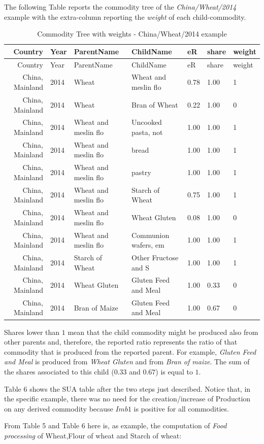 \documentclass[]{article}
\begin{document}
The following Table reports the commodity tree of the
\emph{China/Wheat/2014} example with the extra-column reporting the
\emph{weight} of each child-commodity.

\begin{longtable}[]{@{}rllllll@{}}
\caption{Commodity Tree with weights - China/Wheat/2014
example}\tabularnewline
\toprule
Country & Year & ParentName & ChildName & eR & share &
weight\tabularnewline
\midrule
\endfirsthead
\toprule
Country & Year & ParentName & ChildName & eR & share &
weight\tabularnewline
\midrule
\endhead
China, Mainland & 2014 & Wheat & Wheat and meslin flo & 0.78 & 1.00 &
1\tabularnewline
China, Mainland & 2014 & Wheat & Bran of Wheat & 0.22 & 1.00 &
0\tabularnewline
China, Mainland & 2014 & Wheat and meslin flo & Uncooked pasta, not &
1.00 & 1.00 & 1\tabularnewline
China, Mainland & 2014 & Wheat and meslin flo & bread & 1.00 & 1.00 &
1\tabularnewline
China, Mainland & 2014 & Wheat and meslin flo & pastry & 1.00 & 1.00 &
1\tabularnewline
China, Mainland & 2014 & Wheat and meslin flo & Starch of Wheat & 0.75 &
1.00 & 1\tabularnewline
China, Mainland & 2014 & Wheat and meslin flo & Wheat Gluten & 0.08 &
1.00 & 0\tabularnewline
China, Mainland & 2014 & Wheat and meslin flo & Communion wafers, em &
1.00 & 1.00 & 1\tabularnewline
China, Mainland & 2014 & Starch of Wheat & Other Fructose and S & 1.00 &
1.00 & 1\tabularnewline
China, Mainland & 2014 & Wheat Gluten & Gluten Feed and Meal & 1.00 &
0.33 & 0\tabularnewline
China, Mainland & 2014 & Bran of Maize & Gluten Feed and Meal & 1.00 &
0.67 & 0\tabularnewline
\bottomrule
\end{longtable}

Shares lower than \(1\) mean that the child commodity might be produced
also from other parents and, therefore, the reported ratio represents
the ratio of that commodity that is produced from the reported parent.
For example, \emph{Gluten Feed and Meal} is produced from \emph{Wheat
Gluten} and from \emph{Bran of maize}. The sum of the shares associated
to this child (\(0.33\) and \(0.67\)) is equal to \(1\).

Table 6 shows the SUA table after the two steps just described. Notice
that, in the specific example, there was no need for the
creation/increase of Production on any derived commodity because
\(Imb1\) is positive for all commodities.

From Table 5 and Table 6 here is, as example, the computation of
\emph{Food processing} of Wheat,Flour of wheat and Starch of wheat:
\end{document}
